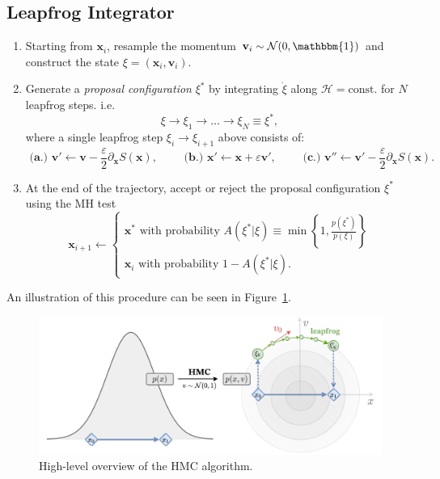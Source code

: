 \documentclass[a4paper,11pt]{article}
\newcommand{\x}{\mathbf{x}}
\newcommand{\p}{\mathbf{v}}
\newcommand{\acceptProb}{%
            A(\xi^{\ast}|\xi) \equiv \min\left\{1,
            \frac{p(\xi^{\ast})}{p(\xi)}\right\}
    }
\begin{document}
\subsection{\label{subsec:lfint}Leapfrog Integrator}
%
\begin{enumerate}
    \item Starting from \(\x_{i}\), resample the momentum \(\p_{i}\sim
        \mathcal{N} (0, \mathbbm{1})\) and construct the state \(\xi =
        (\x_i, \p_i)\).
    \item Generate a \emph{proposal configuration} \(\xi^{\ast}\) by
        integrating \(\dot\xi\) along \(\mathcal{H} = \mathrm{const.}\)
        for \(N\) leapfrog steps.
        i.e.
        \begin{equation}
            \xi \rightarrow \xi_{1}\rightarrow\ldots\rightarrow
            \xi_{N} \equiv \xi^{\ast},
        \end{equation}
        where a single leapfrog step \(\xi_{i} \rightarrow \xi_{i+1}\) above
        consists of:
        \begin{equation}
            \textbf{ (a.) }%
              \p'\leftarrow \p - \frac{\varepsilon}{2}\partial_{\x} S(\x),
            \quad\quad
            \textbf{ (b.) }%
              \x' \leftarrow \x + \varepsilon \p',
            \quad\quad
            \textbf{ (c.) }%
              \p'' \leftarrow \p' - \frac{\varepsilon}{2}\partial_{\x} S(\x).
        \end{equation}
    \item At the end of the trajectory, accept or reject the proposal
        configuration \(\xi^{\ast}\) using the MH test
        \begin{equation}
            \x_{i+1} \leftarrow
            \begin{cases}
                \x^{\ast}\text{ with probability } \acceptProb \\
                \x_{i}\text{ with probability } 1 - A(\xi^{\ast}|\xi).
            \end{cases}
        \end{equation}
\end{enumerate}
%
An illustration of this procedure can be seen in Figure~\ref{fig:hmc}.
%
\begin{figure}[htpb]
    \centering
    \includegraphics[width=\linewidth]{assets/hmc.pdf}
    \caption{\label{fig:hmc}High-level overview of the HMC algorithm.}
\end{figure}
%
\end{document}
